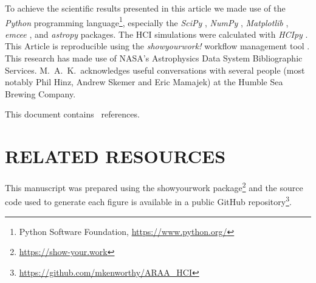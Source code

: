 \documentclass[letterpaper]{ar-1col}
\newcommand{\project}[1]{\textsf{#1}}
\begin{document}
To achieve the scientific results presented in this article we made use of the \emph{Python} programming language\footnote{Python Software Foundation, \url{https://www.python.org/}}, especially the \emph{SciPy} \citep{virtanen2020}, \emph{NumPy} \citep{numpy}, \emph{Matplotlib} \citep{Matplotlib}, \emph{emcee} \citep{foreman-mackey2013}, and \emph{astropy} \citep{astropy_1,astropy_2} packages.
%
The HCI simulations were calculated with \emph{HCIpy} \citep{Por18}.
%
This Article is reproducible using the \emph{showyourwork!} workflow management tool \citep{Luger2021}.
%
This research has made use of NASA's Astrophysics Data System Bibliographic Services.
%
M.\ A.\ K.\ acknowledges useful conversations with several people (most notably
Phil Hinz, Andrew Skemer and Eric Mamajek) at the Humble Sea Brewing Company.

This document contains \ references.





\section*{RELATED RESOURCES}

This manuscript was prepared using the \project{showyourwork} package\footnote{\url{https://show-your.work}} and the source code used to generate each figure is available in a public \project{GitHub} repository\footnote{\url{https://github.com/mkenworthy/ARAA_HCI}}.
\end{document}
